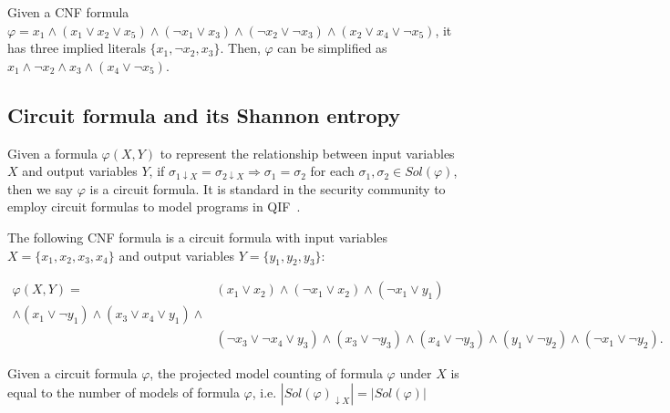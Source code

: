 \begin{example}\label{testenv-example}
Given a CNF formula $\varphi = x_1  \wedge (x_1 \vee x_2 \vee x_5) \wedge (\neg x_1 \vee x_3) \wedge (\neg x_2 \vee \neg x_3) \wedge (x_2 \vee x_4 \vee \neg x_5)$, it has three implied literals $\{x_1, \neg x_2, x_3\}$.
Then, $\varphi$ can be simplified as $x_1 \land \neg x_2 \land x_3 \land (x_4 \vee \neg x_5)$.
\end{example}



\subsection{Circuit formula and its Shannon entropy}
Given a formula $\varphi(X, Y)$ to represent the relationship between input variables $X$ and output variables $Y$, if $\sigma_{1 \downarrow X} = \sigma_{2 \downarrow X} \Longrightarrow \sigma_1 = \sigma_2$ for each $\sigma_1,\sigma_2 \in \mathit{Sol}(\varphi)$, then we say $\varphi$ is a circuit formula.
It is standard in the security community to employ circuit formulas to model programs in QIF~\cite{golia2022scalable}.

\begin{example}\label{circuit-example}
	The following CNF formula is a circuit formula with input variables $X = \{x_1,x_2,x_3,x_4 \}$ and output variables $Y = \{ y_1,y_2,y_3 \}$:
	
	\begin{equation*}
		\begin{split}
			\varphi(X, Y) = & (x_1 \vee x_2) \wedge (\neg x_1 \vee x_2) \wedge (\neg x_1 \vee y_1) \\ 
			\wedge (x_1 \vee \neg y_1) \wedge  (x_3 \vee x_4 \vee y_1) \wedge \\ 
			&  (\neg x_3 \vee \neg x_4 \vee y_3) \wedge (x_3 \vee \neg y_3) \wedge (x_4 \vee \neg y_3) \wedge (y_1 \vee \neg y_2) \wedge (\neg x_1 \vee \neg y_2) .
		\end{split} 
	\end{equation*}
\end{example}


\begin{proposition}\label{projected-proposition}
Given a circuit formula $\varphi$, the projected model counting of formula $\varphi$ under $X$ is equal to the number of models of formula $\varphi$, i.e. $ \left| \mathit{Sol}(\varphi)_{\downarrow X} \right| = \left| \mathit{Sol}(\varphi)  \right|$	
\end{proposition}

